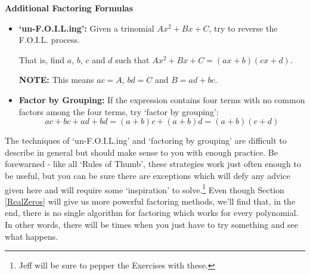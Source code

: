 \documentclass{ximera}
\begin{document}
 

\label{AdvancedReviewFactoring}

\centerline{\textbf{Additional Factoring Formulas}}

\begin{itemize}

\item  \textbf{`un-F.O.I.L.ing':} Given a trinomial $Ax^2 + Bx + C$, try to reverse the F.O.I.L. process.  

That is, find  $a$, $b$, $c$ and $d$ such that $Ax^2 + Bx + C= (ax+b)(cx+d)$.  

\textbf{NOTE:}  This means $ac = A$, $bd = C$ and $B = ad+bc$.

\item \textbf{Factor by Grouping:} If the expression contains four terms with no common factors among the four terms, try `factor by grouping': \[ac + bc + ad + bd = (a +b)c + (a+b)d = (a+b)(c+d)\]

\end{itemize}


 

The techniques of `un-F.O.I.L.ing' and `factoring by grouping' are difficult to describe in general but should make sense to you with enough practice.  Be forewarned - like all `Rules of Thumb', these strategies work just often enough to be useful, but you can be sure there are exceptions which will defy any advice given here and will require some `inspiration' to solve.\footnote{Jeff will be sure to pepper the Exercises with these.} Even though Section \ref{RealZeros} will give us more powerful factoring methods, we'll find that, in the end, there is no single algorithm for factoring which works for every polynomial. In other words, there will be times when you just have to try something and see what happens.
\end{document}
